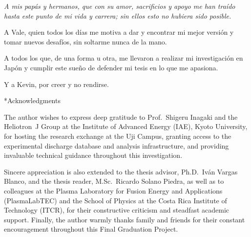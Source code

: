 \documentclass[12pt]{article}
\makeatletter
\providecommand{\chapter}{\@ifstar{\@schapter}{\@chapter}}
\def\@schapter#1{\section*{#1}}
\def\@chapter#1{\section{#1}}
\makeatother
\begin{document}
\vspace*{\fill}
\begin{flushright}
    \begin{minipage}{0.65\linewidth}
        \itshape
        \raggedleft
        A mis papás y hermanos, que con su amor, sacrificios y apoyo me han traído hasta este punto de mi vida y carrera; sin ellos esto no hubiera sido posible. \\ \vspace{1cm}
        
        A Vale, quien todos los días me motiva a dar y encontrar mi mejor versión y tomar nuevos desafíos, sin soltarme nunca de la mano.\\ \vspace{1cm}

        A todos los que, de una forma u otra, me llevaron a realizar mi investigación en Japón y cumplir este sueño de defender mi tesis en lo que me apasiona.\\ \vspace{1cm}

        Y a Kevin, por creer  y no rendirse.
    \end{minipage}
\end{flushright}
\vspace*{\fill}

\clearpage
{}
{}
\chapter*{Acknowledgments}
\thispagestyle{plain}

\vspace{1.5em}

\noindent
The author wishes to express deep gratitude to Prof.~Shigeru Inagaki and the Heliotron~J Group at the Institute of Advanced Energy (IAE), Kyoto University, for hosting the research exchange at the Uji Campus, granting access to the experimental discharge database and analysis infrastructure, and providing invaluable technical guidance throughout this investigation.

\vspace{1em}

\noindent
Sincere appreciation is also extended to the thesis advisor, Ph.D.~Iván Vargas Blanco, and the thesis reader, M.Sc.~Ricardo Solano Piedra, as well as to colleagues at the Plasma Laboratory for Fusion Energy and Applications (PlasmaLabTEC) and the School of Physics at the Costa Rica Institute of Technology (ITCR), for their constructive criticism and steadfast academic support. Finally, the author warmly thanks family and friends for their constant encouragement throughout this Final Graduation Project.
\end{document}
